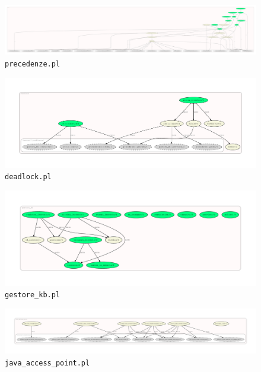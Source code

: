 \begin{figure}
	\includegraphics[width=\textwidth, height=\textheight, keepaspectratio]{code/diagrams/precedenze}
	\caption{\texttt{precedenze.pl}}
\end{figure}

\begin{figure}
	\includegraphics[width=\textwidth, height=\textheight, keepaspectratio]{code/diagrams/deadlock}
	\caption{\texttt{deadlock.pl}}
\end{figure}

\begin{figure}
	\includegraphics[width=\textwidth, height=\textheight, keepaspectratio]{code/diagrams/gestore_kb}
	\caption{\texttt{gestore\_kb.pl}}
\end{figure}

\begin{figure}
	\includegraphics[width=\textwidth, height=\textheight, keepaspectratio]{code/diagrams/java_access_point}
	\caption{\texttt{java\_access\_point.pl}}
\end{figure}

